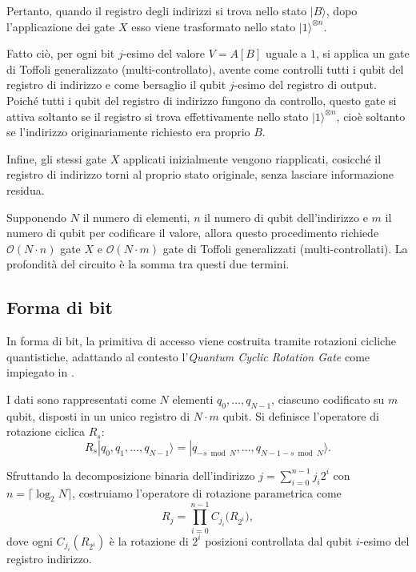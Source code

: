 Pertanto, quando il registro degli indirizzi si trova nello stato $|B\rangle$, dopo l'applicazione dei gate $X$ esso viene trasformato nello stato $|1\rangle^{\otimes n}$.

Fatto ciò, per ogni bit $j$-esimo del valore $V = A[B]$ uguale a $1$, si applica un gate di Toffoli generalizzato (multi-controllato), avente come controlli tutti i qubit del registro di indirizzo e come bersaglio il qubit $j$-esimo del registro di output. Poiché tutti i qubit del registro di indirizzo fungono da controllo, questo gate si attiva soltanto se il registro si trova effettivamente nello stato $|1\rangle^{\otimes n}$, cioè soltanto se l'indirizzo originariamente richiesto era proprio $B$.

Infine, gli stessi gate $X$ applicati inizialmente vengono riapplicati, cosicché il registro di indirizzo torni al proprio stato originale, senza lasciare informazione residua.

Supponendo $N$ il numero di elementi, $n$ il numero di qubit dell'indirizzo e $m$ il numero di qubit per codificare il valore, allora questo procedimento richiede $\mathcal{O}(N \cdot n)$ gate $X$ e $\mathcal{O}(N \cdot m)$ gate di Toffoli generalizzati (multi-controllati). La profondità del circuito è la somma tra questi due termini.

\subsection{Forma di bit}
In forma di bit, la primitiva di accesso viene costruita tramite rotazioni cicliche quantistiche, adattando al contesto l'\emph{Quantum Cyclic Rotation Gate} \cite{pavone2024rotgate} come impiegato in \cite{cantone2026quantumlcs}.

I dati sono rappresentati come $N$ elementi $q_0, \dots, q_{N-1}$, ciascuno codificato su $m$ qubit, disposti in un unico registro di $N \cdot m$ qubit. Si definisce l'operatore di rotazione ciclica $R_s$:
\begin{equation}
  R_s |q_0, q_1, \dots, q_{N-1}\rangle = |q_{-s \bmod N}, \dots, q_{N-1-s \bmod N}\rangle.
\end{equation}

Sfruttando la decomposizione binaria dell'indirizzo $j = \sum_{i=0}^{n-1} j_i 2^i$ con $n = \lceil \log_2 N \rceil$, costruiamo l'operatore di rotazione parametrica come
\begin{equation}
  R_j = \prod_{i=0}^{n-1} C_{j_i}\bigl(R_{2^i}\bigr),
\end{equation}
dove ogni $C_{j_i}(R_{2^i})$ è la rotazione di $2^i$ posizioni controllata dal qubit $i$-esimo del registro indirizzo.

